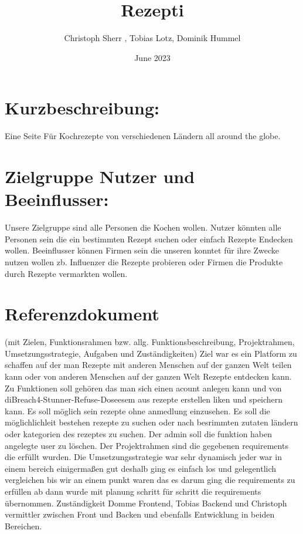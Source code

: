 \documentclass{report}
\title{Rezepti}
\author{ Christoph Sherr , Tobias Lotz, Dominik Hummel }
\date{June 2023}
\begin{document}
\maketitle

\section{Kurzbeschreibung:}
Eine Seite Für Kochrezepte von verschiedenen Ländern all around the globe.

\section{Zielgruppe Nutzer und Beeinflusser:}
Unsere Zielgruppe sind alle Personen die Kochen wollen. Nutzer könnten alle Personen sein die ein bestimmten Rezept suchen oder einfach Rezepte Endecken wollen. Beeinflusser können Firmen sein die unseren konntet für ihre Zwecke nutzen wollen zb. Influenzer die Rezepte probieren oder Firmen die Produkte durch Rezepte vermarkten wollen.

\section{Referenzdokument}
(mit Zielen, Funktionsrahmen bzw. allg. Funktionsbeschreibung, Projektrahmen, Umsetzungsstrategie, Aufgaben und Zuständigkeiten)
\newline\newline
Ziel war es ein Platform zu schaffen auf der man Rezepte mit anderen Menschen auf der ganzen Welt teilen kann oder von anderen Menschen auf der ganzen Welt Rezepte entdecken kann. 
\newline
Zu Funktionen soll gehören das man sich einen acount anlegen kann und von diBreach4-Stunner-Refuse-Doseesem aus rezepte erstellen liken und speichern kann. Es soll möglich sein rezepte ohne anmedlung einzusehen. Es soll die möglichlichleit bestehen rezepte zu suchen oder nach besrimmten zutaten ländern oder kategorien des rezeptes zu suchen. Der admin soll die funktion haben angelegte user zu löschen. 
\newline
Der Projektrahmen sind die gegebenen requirements die erfüllt wurden.
\newline
Die Umsetzungsstrategie war sehr dynamisch jeder war in einem bereich einigermaßen gut deshalb ging es einfach los und gelegentlich vergleichen bis wir an einem punkt waren das es darum ging die requirements zu erfüllen ab dann wurde mit planung schritt für schritt die requirements übernommen. 
\newline
Zuständigkeit Domme Frontend, Tobias Backend und Christoph vermittler zwischen Front und Backen und ebenfalls Entwicklung in beiden Bereichen.
\end{document}

